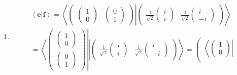 \documentclass[aps,preprint]{revtex4}
\begin{document}
\begin{enumerate}
\item 
\begin{gather}
\left\langle \left. \boldsymbol{e}\right\vert \boldsymbol{f}\right\rangle
=\left\langle \left. \left( 
\begin{array}{cc}
\left( 
\begin{array}{c}
1 \\ 
0%
\end{array}%
\right) & \left( 
\begin{array}{c}
0 \\ 
1%
\end{array}%
\right)%
\end{array}%
\right) \right\vert \left( 
\begin{array}{cc}
\frac{1}{\sqrt{2}}\left( 
\begin{array}{c}
i \\ 
i%
\end{array}%
\right) & \frac{1}{\sqrt{2}}\left( 
\begin{array}{c}
i \\ 
-i%
\end{array}%
\right)%
\end{array}%
\right) \right\rangle \\
=\left\langle \left( 
\begin{array}{c}
\left( 
\begin{array}{c}
1 \\ 
0%
\end{array}%
\right) \\ 
\left( 
\begin{array}{c}
0 \\ 
1%
\end{array}%
\right)%
\end{array}%
\right) \right\vert \left\vert \left( 
\begin{array}{cc}
\frac{1}{\sqrt{2}}\left( 
\begin{array}{c}
i \\ 
i%
\end{array}%
\right) & \frac{1}{\sqrt{2}}\left( 
\begin{array}{c}
i \\ 
-i%
\end{array}%
\right)%
\end{array}%
\right) \right\rangle =\left( 
\begin{array}{c}
\left\langle \left( 
\begin{array}{c}
1 \\ 
0%
\end{array}%
\right) \right\vert \\ 

\end{array}
\end{gather}
\end{enumerate}
\end{document}
